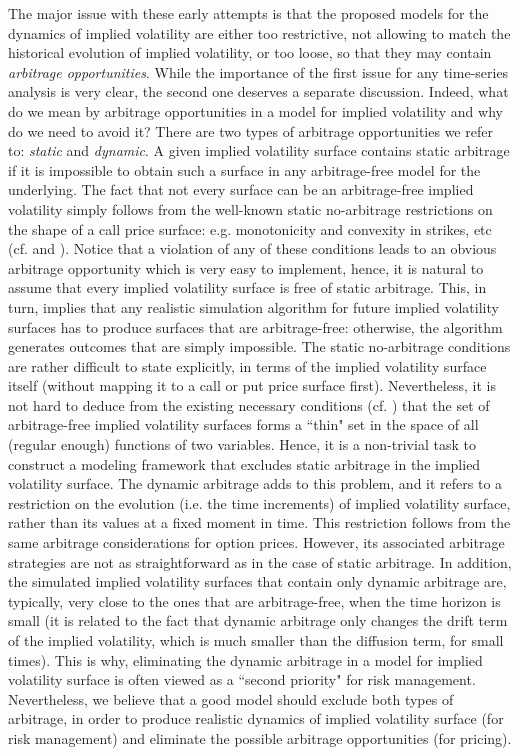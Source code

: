 \documentclass{article}
\numberwithin{equation}{section}
\begin{document}
The major issue with these early attempts is that the proposed models for the dynamics of implied volatility are either too restrictive, not allowing to match the historical evolution of implied volatility, or too loose, so that they may contain \emph{arbitrage opportunities}. While the importance of the first issue for any time-series analysis is very clear, the second one deserves a separate discussion. Indeed, what do we mean by arbitrage opportunities in a model for implied volatility and why do we need to avoid it? There are two types of arbitrage opportunities we refer to: \emph{static} and \emph{dynamic}. A given implied volatility surface contains static arbitrage if it is impossible to obtain such a surface in any arbitrage-free model for the underlying. The fact that not every surface can be an arbitrage-free implied volatility simply follows from the well-known static no-arbitrage restrictions on the shape of a call price surface: e.g. monotonicity and convexity in strikes, etc (cf. \cite{Cousot2007conditions} and \cite{derman1998tree}). Notice that a violation of any of these conditions leads to an obvious arbitrage opportunity which is very easy to implement, hence, it is natural to assume that every implied volatility surface is free of static arbitrage.  This, in turn, implies that any realistic simulation algorithm for future implied volatility surfaces has to produce surfaces that are arbitrage-free: otherwise, the algorithm generates outcomes that are simply impossible. The static no-arbitrage conditions are rather difficult to state explicitly, in terms of the implied volatility surface itself (without mapping it to a call or put price surface first). Nevertheless, it is not hard to deduce from the existing necessary conditions (cf. \cite{lee2005implied}) that the set of arbitrage-free implied volatility surfaces forms a ``thin" set in the space of all (regular enough) functions of two variables. Hence, it is a non-trivial task to construct a modeling framework that excludes static arbitrage in the implied volatility surface. The dynamic arbitrage adds to this problem, and it refers to a restriction on the evolution (i.e. the time increments) of implied volatility surface, rather than its values at a fixed moment in time. This restriction follows from the same arbitrage considerations for option prices. However, its associated arbitrage strategies are not as straightforward as in the case of static arbitrage. In addition, the simulated implied volatility surfaces that contain only dynamic arbitrage are, typically, very close to the ones that are arbitrage-free, when the time horizon is small (it is related to the fact that dynamic arbitrage only changes the drift term of the implied volatility, which is much smaller than the diffusion term, for small times). This is why, eliminating the dynamic arbitrage in a model for implied volatility surface is often viewed as a ``second priority" for risk management. Nevertheless, we believe that a good model should exclude both types of arbitrage, in order to produce realistic dynamics of implied volatility surface (for risk management) and eliminate the possible arbitrage opportunities (for pricing).
\end{document}
